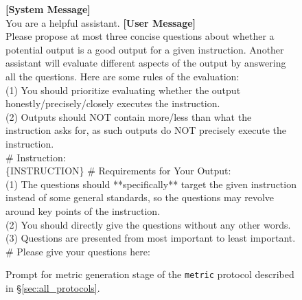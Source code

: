 \begin{figure*}[t!]
\begin{tcolorbox}[colback=black!3!white, colframe=black!70!white, title=Metric (metric generation prompt), fontupper=\footnotesize, fonttitle=\footnotesize]
\textbf{[System Message]} \\
You are a helpful assistant.
\newline
\newline
\textbf{[User Message]}\\
Please propose at most three concise questions about whether a potential output is a good output for a given instruction. Another assistant will evaluate different aspects of the output by answering all the questions.
\newline
\newline
Here are some rules of the evaluation: \\
(1) You should prioritize evaluating whether the output honestly/precisely/closely executes the instruction.
\\
(2) Outputs should NOT contain more/less than what the instruction asks for, as such outputs do NOT precisely execute the instruction.
\\
\newline
\# Instruction: \\
\{INSTRUCTION\}
\newline
\newline
\# Requirements for Your Output: \\
(1) The questions should **specifically** target the given instruction instead of some general standards, so the questions may revolve around key points of the instruction. \\
(2) You should directly give the questions without any other words. \\
(3) Questions are presented from most important to least important.\\
\newline
\# Please give your questions here:

\end{tcolorbox}
\caption{Prompt for metric generation stage of the \texttt{metric} protocol described in \S\ref{sec:all_protocols}.}
\label{fig:prompt_metric_gen}
\end{figure*}



